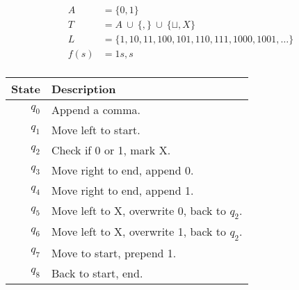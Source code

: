 \documentclass[a4paper, hidelinks, twocolumn, 9pt]{article}
\title{\topicname}
\author{}
\date{}
\newcommand{\blm}{\sqcup}
\begin{document}
  
  \maketitle
  \thispagestyle{fancy}

  \begin{align*}
      A &= \{ 0, 1 \} \\
      T &= A \ \cup \ \{ , \} \ \cup \  \{ \blm,  X \} \\
      L &= \{1, 10, 11, 100, 101, 110, 111, 1000, 1001, \ldots \} \\
      f(s) &= 1s,s \\
  \end{align*}

  
  \begin{table}[H]
    \centering
    \begin{tabular}{rl}
        \textbf{State} & \textbf{Description} \\
        \midrule
        \( q_0 \) & Append a comma. \\
        \( q_1 \) & Move left to start. \\
        \( q_2 \) & Check if 0 or 1, mark X. \\
        \( q_3 \) & Move right to end, append 0. \\
        \( q_4 \) & Move right to end, append 1. \\
        \( q_5 \) & Move left to X, overwrite 0, back to \(q_2\). \\
        \( q_6 \) & Move left to X, overwrite 1, back to \(q_2\). \\
        \( q_7 \) & Move to start, prepend 1. \\
        \( q_8 \) & Back to start, end. \\
    \end{tabular}
  \end{table}
\end{document}
